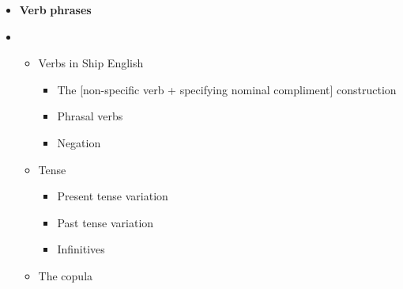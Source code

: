 \begin{itemize}
\item \begin{styleListParagraph}
\textbf{Verb} \textbf{phrases} 
\end{styleListParagraph}
\end{itemize}

\setcounter{itemize}{5}
\begin{itemize}
\item \begin{itemize}
\item \begin{styleListParagraph}
Verbs in Ship English 
\end{styleListParagraph}

\begin{itemize}
\item \begin{styleListParagraph}
The [non-specific verb + specifying nominal compliment] construction
\end{styleListParagraph}
\item \begin{styleListParagraph}
Phrasal verbs 
\end{styleListParagraph}
\item \begin{styleListParagraph}
Negation
\end{styleListParagraph}
\end{itemize}
\item \begin{styleListParagraph}
Tense 
\end{styleListParagraph}

\begin{itemize}
\item \begin{styleListParagraph}
Present tense variation
\end{styleListParagraph}
\item \begin{styleListParagraph}
Past tense variation 
\end{styleListParagraph}
\item \begin{styleListParagraph}
Infinitives 
\end{styleListParagraph}
\end{itemize}
\item \begin{styleListParagraph}
The copula 
\end{styleListParagraph}


\end{itemize}
\end{itemize}
